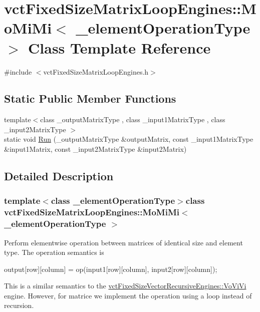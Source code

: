 \hypertarget{classvct_fixed_size_matrix_loop_engines_1_1_mo_mi_mi}{\section{vct\-Fixed\-Size\-Matrix\-Loop\-Engines\-:\-:Mo\-Mi\-Mi$<$ \-\_\-element\-Operation\-Type $>$ Class Template Reference}
\label{classvct_fixed_size_matrix_loop_engines_1_1_mo_mi_mi}
}


{\ttfamily \#include $<$vct\-Fixed\-Size\-Matrix\-Loop\-Engines.\-h$>$}

\subsection*{Static Public Member Functions}
\begin{DoxyCompactItemize}
\item 
{\footnotesize template$<$class \-\_\-output\-Matrix\-Type , class \-\_\-input1\-Matrix\-Type , class \-\_\-input2\-Matrix\-Type $>$ }\\static void \hyperlink{classvct_fixed_size_matrix_loop_engines_1_1_mo_mi_mi_ad29d9351a16c8b34d3aa7e8b71969b6e}{Run} (\-\_\-output\-Matrix\-Type \&output\-Matrix, const \-\_\-input1\-Matrix\-Type \&input1\-Matrix, const \-\_\-input2\-Matrix\-Type \&input2\-Matrix)
\end{DoxyCompactItemize}


\subsection{Detailed Description}
\subsubsection*{template$<$class \-\_\-element\-Operation\-Type$>$class vct\-Fixed\-Size\-Matrix\-Loop\-Engines\-::\-Mo\-Mi\-Mi$<$ \-\_\-element\-Operation\-Type $>$}

Perform elementwise operation between matrices of identical size and element type. The operation semantics is 
\begin{DoxyCode}
output[row][column] = op(input1[row][column], input2[row][column]);
\end{DoxyCode}


This is a similar semantics to the \hyperlink{classvct_fixed_size_vector_recursive_engines_1_1_vo_vi_vi}{vct\-Fixed\-Size\-Vector\-Recursive\-Engines\-::\-Vo\-Vi\-Vi} engine. However, for matrice we implement the operation using a loop instead of recursion.

